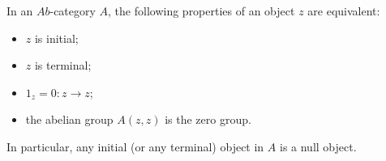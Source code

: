 In an $\textit{Ab}$-category $A$, the following properties of an object $z$ are equivalent:
\begin{itemize}
\item[(i)] $z$ is initial;
\item[(ii)] $z$ is terminal;
\item[(iii)] $1_z = 0 : z \to z$;
\item[(iv)] the abelian group $A(z,z)$ is the zero group.
\end{itemize}
In particular, any initial (or any terminal) object in $A$ is a null object.
